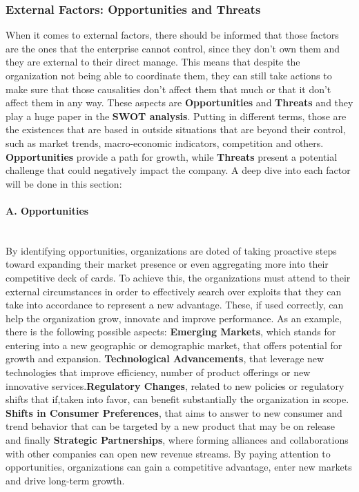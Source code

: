 \subsubsection{External Factors: Opportunities and Threats}
When it comes to external factors, there should be informed that those factors are the ones that the enterprise cannot control, since 
they don't own them and they are external to their direct manage. This means that despite the organization not being able to coordinate 
them, they can still take actions to make sure that those causalities don't affect them that much or that it don't affect them in any way. These aspects are \textbf{Opportunities} and \textbf{Threats} and they play a huge paper in the \textbf{SWOT analysis}. Putting in different terms, those are the existences that are based in outside situations that are beyond their control, such as market trends, macro-economic indicators, competition and others. \textbf{Opportunities} provide a path for growth, while \textbf{Threats} present a potential challenge that could negatively impact the company.
A deep dive into each factor will be done in this section:

\paragraph{A. Opportunities}\mbox{}\\
By identifying opportunities, organizations are doted of taking proactive steps toward expanding their market presence or even aggregating 
more into their competitive deck of cards. To achieve this, the organizations must attend to their external circumstances in order to 
effectively search over exploits that they can take into accordance to represent a new advantage. These, if used correctly, can help the 
organization grow, innovate and improve performance.
As an example, there is the following possible aspects: \textbf{Emerging Markets}, which stands for entering into a new geographic or 
demographic market, that offers potential for growth and expansion. \textbf{Technological Advancements}, that leverage new technologies 
that improve efficiency, number of product offerings or new innovative services.\textbf{Regulatory Changes}, related to new policies or 
regulatory shifts that if,taken into favor, can benefit substantially the organization in scope. \textbf{Shifts in Consumer Preferences}, 
that aims to answer to new consumer and trend behavior that can be targeted by a new product that may be on release and finally 
\textbf{Strategic Partnerships}, where forming alliances and collaborations with other companies can open new revenue streams.
By paying attention to opportunities, organizations can gain a competitive advantage, enter new markets and drive long-term growth.

